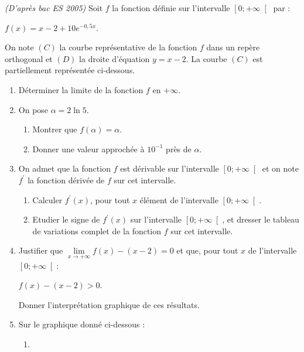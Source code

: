
%
\textit{(D'après bac ES 2005)}
Soit $f$ la fonction définie sur l'intervalle $\left[0;+\infty \right[$ par :
\begin{center}$f\left(x\right)=x-2+10e^{-0,5x}$.\end{center}
On note $\left(C\right)$ la courbe représentative de la fonction $f$ dans un repère orthogonal et $\left(D\right)$ la droite d'équation $y=x-2$. La courbe $\left(C\right)$ est partiellement représentée ci-dessous.
\begin{enumerate}
     \item
     Déterminer la limite de la fonction $f$ en $+\infty $.
     \item
     On pose $\alpha =2 \ln 5$.
     \begin{enumerate}[label=\alph*.] 
          \item
          Montrer que $f\left(\alpha \right)=\alpha $.
          \item
     Donner une valeur approchée à $10^{-1}$ près de $\alpha $.\end{enumerate}
     \item
     On admet que la fonction $f$ est dérivable sur l'intervalle $\left[0;+\infty \right[$ et on note $f^{\prime}$ la fonction dérivée de $f$ sur cet intervalle.
     \begin{enumerate}[label=\alph*.]
          \item
          Calculer $f^{\prime}\left(x\right)$, pour tout $x$ élément de l'intervalle $\left[0;+\infty \right[$.
          \item
     Etudier le signe de $f^{\prime}\left(x\right)$ sur l'intervalle $\left[0;+\infty \right[$, et dresser le tableau de variations complet de la fonction $f$ sur cet intervalle.\end{enumerate}
     \item
     Justifier que $\lim\limits_{x\rightarrow +\infty }f\left(x\right)-\left(x-2\right)=0$ et que, pour tout $x$ de l'intervalle $\left[0;+\infty \right[$:
     \begin{center} $f\left(x\right)-\left(x-2\right) > 0$.\end{center}
     Donner l'interprétation graphique de ces résultats.
     \item
     Sur le graphique donné ci-dessous :
     \begin{enumerate}[label=\alph*.]
          \item

\end{enumerate}
\end{enumerate}
